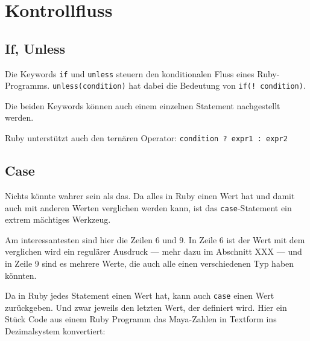 \documentclass[a4book,11pt,twoside]{scrbook}
\begin{document}








\section{Kontrollfluss} %
\label{sec:kontrollfluss}

\subsection*{If, Unless} %
\label{ssub:if_unless}
Die Keywords \texttt{if} und \texttt{unless} steuern den konditionalen Fluss eines Ruby-Programms. \texttt{unless(condition)} hat dabei die Bedeutung von \texttt{if(! condition)}.

Die beiden Keywords können auch einem einzelnen Statement nachgestellt werden.



Ruby unterstützt auch den ternären Operator: \texttt{condition ? expr1 : expr2}


\subsection*{Case} %
\label{sub:case}
\begin{quotation}
\end{quotation}

Nichts könnte wahrer sein als das. Da alles in Ruby einen Wert hat und damit auch mit anderen Werten verglichen werden kann, ist das \texttt{case}-Statement ein extrem mächtiges Werkzeug.



Am interessantesten sind hier die Zeilen 6 und 9. In Zeile 6 ist der Wert mit dem verglichen wird ein regulärer Ausdruck — mehr dazu im Abschnitt XXX — und in Zeile 9 sind es mehrere Werte, die auch alle einen verschiedenen Typ haben könnten.


Da in Ruby jedes Statement einen Wert hat, kann auch \texttt{case} einen Wert zurückgeben. Und zwar jeweils den letzten Wert, der definiert wird. Hier ein Stück Code aus einem Ruby Programm das Maya-Zahlen in Textform ins Dezimalsystem konvertiert:
\end{document}
